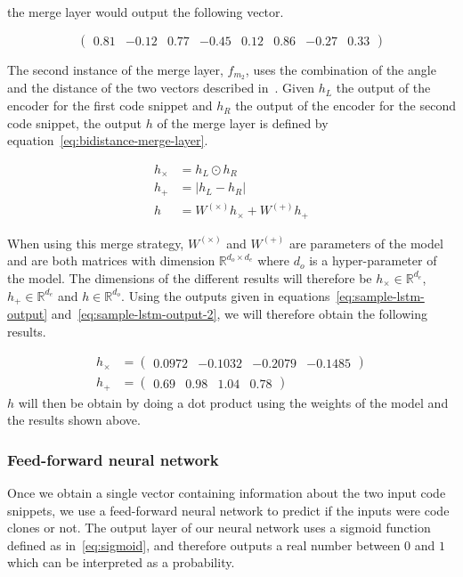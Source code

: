 the merge layer would output the following vector.

\begin{equation}
  \begin{pmatrix}
    0.81 & -0.12 & 0.77 & -0.45 & 0.12 & 0.86 & -0.27 & 0.33
  \end{pmatrix}
\end{equation}

The second instance of the merge layer, $f_{m_2}$, uses the combination of the angle and the
distance of the two vectors described in~\cite{DBLP:journals/corr/TaiSM15}.
Given $h_L$ the output of the encoder for the first code snippet and $h_R$ the
output of the encoder for the second code snippet, the output $h$ of the merge
layer is defined by equation~\ref{eq:bidistance-merge-layer}.

\begin{align}
  \label{eq:bidistance-merge-layer}
  h_\times &= h_L \odot h_R\\
  h_+ &= |h_L - h_R| \nonumber\\
  h &= W^{(\times)}h_\times + W^{(+)}h_+ \nonumber
\end{align}

When using this merge strategy, $W^{(\times)}$ and $W^{(+)}$ are parameters of
the model and are both matrices with dimension $\mathbb{R}^{d_o\times d_e}$
where $d_o$ is a hyper-parameter of the model. The dimensions of the different
results will therefore be $h_\times \in \mathbb{R}^{d_e}$, $h_+ \in
\mathbb{R}^{d_e}$ and $h \in \mathbb{R}^{d_o}$. Using the outputs given in
equations~\ref{eq:sample-lstm-output} and~\ref{eq:sample-lstm-output-2}, we will
therefore obtain the following results.

\begin{align*}
  h_\times &= \begin{pmatrix}0.0972 & -0.1032 & -0.2079 & -0.1485\end{pmatrix}\\
  h_+ &= \begin{pmatrix}0.69 & 0.98 & 1.04 & 0.78\end{pmatrix}
\end{align*}
$h$ will then be obtain by doing a dot product using the weights of the model
and the results shown above.
\subsubsection{Feed-forward neural network}
Once we obtain a single vector containing information about the two input code
snippets, we use a feed-forward neural network to predict if the inputs were
code clones or not. The output layer of our neural network uses a sigmoid
function defined as in~\ref{eq:sigmoid}, and therefore outputs a real number
between $0$ and $1$ which can be interpreted as a probability.

